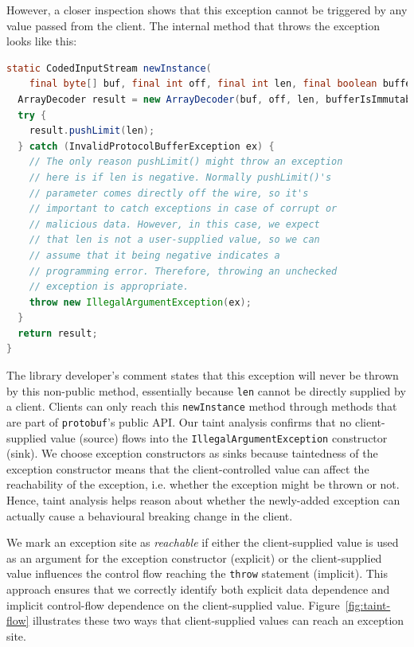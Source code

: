 However, a closer inspection shows that this exception cannot be triggered by any value passed from the client. The internal method that throws the exception looks like this:

\begin{lstlisting}[language=Java,breaklines=true,basicstyle=\scriptsize\ttfamily]
static CodedInputStream newInstance(
    final byte[] buf, final int off, final int len, final boolean bufferIsImmutable) {
  ArrayDecoder result = new ArrayDecoder(buf, off, len, bufferIsImmutable);
  try {
    result.pushLimit(len);
  } catch (InvalidProtocolBufferException ex) {
    // The only reason pushLimit() might throw an exception
    // here is if len is negative. Normally pushLimit()'s
    // parameter comes directly off the wire, so it's 
    // important to catch exceptions in case of corrupt or
    // malicious data. However, in this case, we expect 
    // that len is not a user-supplied value, so we can 
    // assume that it being negative indicates a 
    // programming error. Therefore, throwing an unchecked 
    // exception is appropriate.
    throw new IllegalArgumentException(ex);
  }
  return result;
}
\end{lstlisting}

The library developer's comment states that this exception will never be thrown by this non-public method, essentially because \texttt{len} cannot be directly supplied by a client. Clients can only reach this \texttt{newInstance} method through methods that are part of \texttt{protobuf}'s public API. Our taint analysis confirms that no client-supplied value (source) flows into the \texttt{IllegalArgumentException} constructor (sink). We choose exception constructors as sinks because taintedness of the exception constructor means that the client-controlled value can affect the reachability of the exception, i.e. whether the exception might be thrown or not. Hence, taint analysis helps reason about whether the newly-added exception can actually cause a behavioural breaking change in the client.

We mark an exception site as \emph{reachable} if either the client-supplied value is used as an argument for the exception constructor (explicit) or the client-supplied value influences the control flow reaching the \texttt{throw} statement (implicit). This approach ensures that we correctly identify both explicit data dependence and implicit control-flow dependence on the client-supplied value.
Figure~\ref{fig:taint-flow} illustrates these two ways that client-supplied values can reach an exception site.

